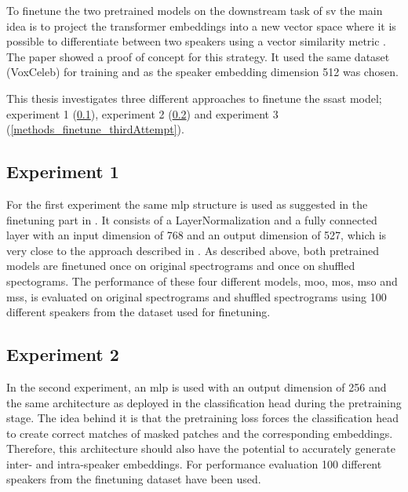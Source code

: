 To finetune the two pretrained models on the downstream task of \gls{sv} the main idea is to project the transformer embeddings into a new vector space where it is possible to differentiate between two speakers using a vector similarity metric \cite{chung2020ContrastiveLoss, chung2018voxceleb2}. The paper \cite{chung2018voxceleb2} showed a proof of concept for this strategy. It used the same dataset (VoxCeleb) for training and as the speaker embedding dimension 512 was chosen. 

This thesis investigates three different approaches to finetune the \gls{ssast} model; experiment 1 (\ref{methods_finetune_firstAttempt}), experiment 2 (\ref{methods_finetune_secondAttempt}) and experiment 3 (\ref{methods_finetune_thirdAttempt}).

\subsection{Experiment 1}
\label{methods_finetune_firstAttempt}
For the first experiment the same \gls{mlp} structure is used as suggested in the finetuning part in \cite{gong2022ssast}. It consists of a LayerNormalization and a fully connected layer with an input dimension of 768 and an output dimension of 527, which is very close to the approach described in \cite{chung2018voxceleb2}. As described above, both pretrained models are finetuned once on original spectrograms and once on shuffled spectograms. The performance of these four different models, \gls{moo}, \gls{mos}, \gls{mso} and \gls{mss}, is evaluated on original spectrograms and shuffled spectrograms using 100 different speakers from the dataset used for finetuning.

\subsection{Experiment 2}
\label{methods_finetune_secondAttempt}
In the second experiment, an \gls{mlp} is used with an output dimension of 256 and the same architecture as deployed in the classification head during the pretraining stage. The idea behind it is that the pretraining loss forces the classification head to create correct matches of masked patches and the corresponding embeddings. Therefore, this architecture should also have the potential to accurately generate inter- and intra-speaker embeddings. For performance evaluation 100 different speakers from the finetuning dataset have been used.

